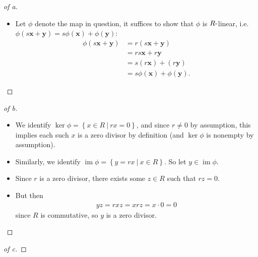 \begin{solution}

\envlist

\begin{proof}[of a]

\envlist

\begin{itemize}
\tightlist
\item
  Let \(\phi\) denote the map in question, it suffices to show that
  \(\phi\) is \(R{\hbox{-}}\)linear,
  i.e.~\(\phi(s\mathbf{x} + \mathbf{y}) = s\phi(\mathbf{x}) + \phi(\mathbf{y})\):
  \begin{align*}
  \phi(s\mathbf{x} + \mathbf{y}) 
  &= r(s\mathbf{x} + \mathbf{y}) \\
  &= rs\mathbf{x} + r\mathbf{y} \\
  &= s(r\mathbf{x}) + (r\mathbf{y}) \\
  &= s\phi(\mathbf{x}) + \phi(\mathbf{y})
  .\end{align*}
\end{itemize}

\end{proof}

\begin{proof}[of b]

\envlist

\begin{itemize}
\item
  We identify
  \(\ker \phi = \left\{{x\in R {~\mathrel{\Big|}~}rx = 0}\right\}\), and
  since \(r\neq 0\) by assumption, this implies each such \(x\) is a
  zero divisor by definition (and \(\ker \phi\) is nonempty by
  assumption).
\item
  Similarly, we identify
  \(\operatorname{im}\phi = \left\{{y = rx {~\mathrel{\Big|}~}x\in R}\right\}\).
  So let \(y\in \operatorname{im}\phi\).
\item
  Since \(r\) is a zero divisor, there exists some \(z\in R\) such that
  \(rz = 0\).
\item
  But then
  \begin{align*}
  yz = rxz = xrz = x\cdot 0 = 0
  \end{align*}
  since \(R\) is commutative, so \(y\) is a zero divisor.
\end{itemize}

\end{proof}

\begin{proof}[of c]

\envlist


\end{proof}
\end{solution}
